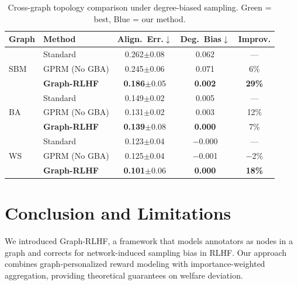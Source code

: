 \documentclass{article}
\theoremstyle{plain}
\theoremstyle{definition}
\theoremstyle{remark}
\begin{document}
\begin{table}[ht]
\caption{Cross-graph topology comparison under degree-biased sampling. \colorbox{bestgreen}{Green} = best, \colorbox{goodblue}{Blue} = our method.}
\label{tab:cross-graph}
\centering
\small
\begin{tabular}{llccc}
\toprule
\textbf{Graph} & \textbf{Method} & \textbf{Align.\ Err.}$\downarrow$ & \textbf{Deg.\ Bias}$\downarrow$ & \textbf{Improv.} \\
\midrule
\multirow{3}{*}{SBM}
& \cellcolor{neutralgray}Standard & \cellcolor{neutralgray}0.262{\tiny$\pm$0.08} & \cellcolor{neutralgray}0.062 & \cellcolor{neutralgray}--- \\
& GPRM (No GBA) & 0.245{\tiny$\pm$0.06} & 0.071 & 6\% \\
& \cellcolor{goodblue}\textbf{Graph-RLHF} & \cellcolor{bestgreen}\textbf{0.186}{\tiny$\pm$0.05} & \cellcolor{bestgreen}\textbf{0.002} & \cellcolor{bestgreen}\textbf{29\%} \\
\midrule
\multirow{3}{*}{BA}
& \cellcolor{neutralgray}Standard & \cellcolor{neutralgray}0.149{\tiny$\pm$0.02} & \cellcolor{neutralgray}0.005 & \cellcolor{neutralgray}--- \\
& GPRM (No GBA) & 0.131{\tiny$\pm$0.02} & 0.003 & 12\% \\
& \cellcolor{goodblue}\textbf{Graph-RLHF} & \cellcolor{bestgreen}\textbf{0.139}{\tiny$\pm$0.08} & \cellcolor{bestgreen}\textbf{0.000} & \cellcolor{goodblue}7\% \\
\midrule
\multirow{3}{*}{WS}
& \cellcolor{neutralgray}Standard & \cellcolor{neutralgray}0.123{\tiny$\pm$0.04} & \cellcolor{neutralgray}$-$0.000 & \cellcolor{neutralgray}--- \\
& GPRM (No GBA) & 0.125{\tiny$\pm$0.04} & $-$0.001 & $-$2\% \\
& \cellcolor{goodblue}\textbf{Graph-RLHF} & \cellcolor{bestgreen}\textbf{0.101}{\tiny$\pm$0.06} & \cellcolor{bestgreen}\textbf{0.000} & \cellcolor{bestgreen}\textbf{18\%} \\
\bottomrule
\end{tabular}
\end{table}

\section{Conclusion and Limitations}

We introduced Graph-RLHF, a framework that models annotators as nodes in a graph and corrects for network-induced sampling bias in RLHF. Our approach combines graph-personalized reward modeling with importance-weighted aggregation, providing theoretical guarantees on welfare deviation.
\end{document}

